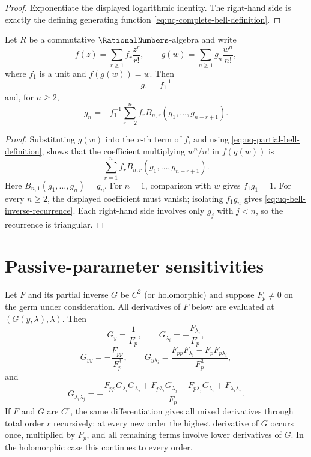 \begin{proof}
Exponentiate the displayed logarithmic identity.  The right-hand side is
exactly the defining generating function
\eqref{eq:uq-complete-bell-definition}.
\end{proof}

\begin{theorem}
\label{thm:uq-bell-inverse-recursion}
Let \(R\) be a commutative \(\RationalNumbers\)-algebra and write
\[
 f(z)=\sum_{r\ge1}f_r\frac{z^r}{r!},\qquad
 g(w)=\sum_{n\ge1}g_n\frac{w^n}{n!},
\]
where \(f_1\) is a unit and \(f(g(w))=w\).  Then
\[
 g_1=f_1^{-1}
\]
and, for \(n\ge2\),
\begin{equation}
\label{eq:uq-bell-inverse-recurrence}
 g_n=-f_1^{-1}\sum_{r=2}^{n}
 f_rB_{n,r}(g_1,\ldots,g_{n-r+1}).
\end{equation}
\end{theorem}

\begin{proof}
Substituting \(g(w)\) into the \(r\)-th term of \(f\), and using
\eqref{eq:uq-partial-bell-definition}, shows that the coefficient multiplying
\(w^n/n!\) in \(f(g(w))\) is
\[
 \sum_{r=1}^{n}f_r
 B_{n,r}(g_1,\ldots,g_{n-r+1}).
\]
Here \(B_{n,1}(g_1,\ldots,g_n)=g_n\).  For \(n=1\), comparison with
\(w\) gives \(f_1g_1=1\).  For every \(n\ge2\), the displayed coefficient
must vanish; isolating \(f_1g_n\) gives
\eqref{eq:uq-bell-inverse-recurrence}.  Each right-hand side involves only
\(g_j\) with \(j<n\), so the recurrence is triangular.
\end{proof}

\section{Passive-parameter sensitivities}
\label{sec:uq-sensitivities}

\begin{theorem}
\label{thm:uq-inverse-sensitivities}
Let \(F\) and its partial inverse \(G\) be \(C^2\) (or holomorphic) and suppose
\(F_p\ne0\) on the germ under consideration.  All derivatives of \(F\) below
are evaluated at \((G(y,\lambda),\lambda)\).  Then
\[
 G_y=\frac1{F_p},
 \qquad
 G_{\lambda_i}=-\frac{F_{\lambda_i}}{F_p},
\]
\[
 G_{yy}=-\frac{F_{pp}}{F_p^3},
 \qquad
 G_{y\lambda_i}
 =\frac{F_{pp}F_{\lambda_i}-F_pF_{p\lambda_i}}{F_p^3},
\]
and
\[
 G_{\lambda_i\lambda_j}
 =-\frac{
 F_{pp}G_{\lambda_i}G_{\lambda_j}
 +F_{p\lambda_i}G_{\lambda_j}
 +F_{p\lambda_j}G_{\lambda_i}
+F_{\lambda_i\lambda_j}}{F_p}.
\]
If \(F\) and \(G\) are \(C^r\), the same differentiation gives all mixed
derivatives through total order \(r\) recursively: at every new order the
highest derivative of \(G\) occurs once, multiplied by \(F_p\), and all
remaining terms involve lower derivatives of \(G\).  In the holomorphic case
this continues to every order.
\end{theorem}

